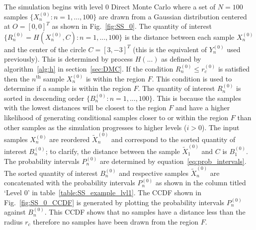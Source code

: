 \documentclass[journal]{IEEEtran}
\begin{document}
The simulation begins with level 0 Direct Monte Carlo where a set of $N = 100$ samples $\{X_{n}^{(0)}: n = 1,...,100\}$ are drawn from a Gaussian distribution centered at $O = [0,0]^{T}$ as shown in Fig.~\ref{fig:SS_0}. The quantity of interest $\{R_{n}^{(0)} = H(X_{n}^{(0)},C): n = 1,...,100\}$ is the distance between each sample $X_{n}^{(0)}$ and the center of the circle $C = [3,-3]^{T}$ (this is the equivalent of $Y_{n}^{(0)}$ used previously). This is determined by process $H(...)$ as defined by algorithm~\ref{alg:h} in section~\ref{sec:DMC}. If the condition $R_{n}^{(0)} \leq r_{c}^{(0)}$ is satisfied then the $n^{\text{th}}$ sample $X_{n}^{(0)}$ is within the region $F$. This condition is used to determine if a sample is within the region $F$. The quantity of interest $R_{n}^{(0)}$ is sorted in descending order $\{B_{n}^{(0)}: n = 1,...,100\}$. This is because the samples with the lowest distances will be closest to the region $F$ and have a higher likelihood of generating conditional samples closer to or within the region $F$ than other samples as the simulation progresses to higher levels ($i > 0$). The input samples $X_{n}^{(0)}$ are reordered $\tilde{X}_{n}^{(0)}$ and correspond to the sorted quantity of interest $B_{n}^{(0)}$; to clarify, the distance between the sample $\tilde{X}_{1}^{(0)}$ and $C$ is $B_{1}^{(0)}$. The probability intervals $P_{n}^{(0)}$ are determined by equation~\ref{eq:prob_intervals}. The sorted quantity of interest $B_{n}^{(0)}$ and respective samples $\tilde{X}_{n}^{(0)}$ are concatenated with the probability intervals $P_{n}^{(0)}$ as shown in the column titled `Level 0' in table~\ref{table:SS_example_lvl1}. The CCDF shown in Fig.~\ref{fig:SS_0_CCDF} is generated by plotting the probability intervals $P_{n}^{(0)}$ against $B_{n}^{(0)}$. This CCDF shows that no samples have a distance less than the radius $r_{c}$ therefore no samples have been drawn from the region $F$.
\end{document}
